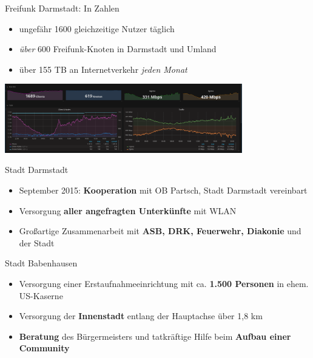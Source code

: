 \documentclass[t]{beamer}
\begin{document}
   \begin{frame}{Freifunk Darmstadt: In Zahlen}
    \begin{itemize}
	  \item ungefähr 1600 gleichzeitige Nutzer täglich
	  \item \emph{über} 600 Freifunk-Knoten in Darmstadt und Umland
	  \item über 155 TB an Internetverkehr \emph{jeden Monat}
    \end{itemize}
    \begin{center}
      \includegraphics[height=3cm]{images/stats/grafana/2017_05_02}
    \end{center}
  \end{frame}


  \begin{frame}{Stadt Darmstadt}
    \begin{itemize}
      \item September 2015: \textbf{Kooperation} mit OB Partsch, Stadt Darmstadt vereinbart
      \item Versorgung \textbf{aller angefragten Unterkünfte} mit WLAN
      \item Großartige Zusammenarbeit mit \textbf{ASB, DRK, Feuerwehr, Diakonie} und der Stadt
    \end{itemize}
  \end{frame}

  \begin{frame}{Stadt Babenhausen}
    \begin{itemize}
      \item Versorgung einer Erstaufnahmeeinrichtung mit ca. \textbf{1.500 Personen} in ehem. US-Kaserne
      \item Versorgung der \textbf{Innenstadt} entlang der Hauptachse über 1,8 km
      \item \textbf{Beratung} des Bürgermeisters und tatkräftige Hilfe beim \textbf{Aufbau einer Community}
    \end{itemize}
  \end{frame}
\end{document}
